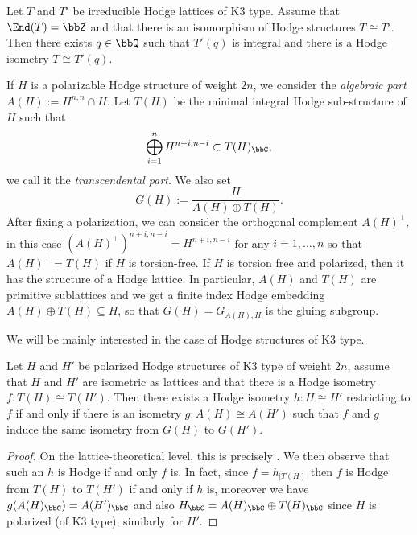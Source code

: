 \documentclass{amsart}
\begin{document}
\begin{proposition}\label{prop:meinsma}
    Let \(T\) and \(T'\) be irreducible Hodge lattices of K3 type. Assume that \(\End(T)=\bbZ\) and that there is an isomorphism of Hodge structures \(T\cong T'\). Then there exists \(q\in \bbQ\) such that \(T'(q)\) is integral and there is a Hodge isometry \(T\cong T'(q)\).
\end{proposition}

If \(H\) is a polarizable Hodge structure of weight \(2n\), we consider the \textit{algebraic part} \(A(H):= H^{n,n}\cap H\). Let \(T(H)\) be the minimal integral Hodge sub-structure of \(H\) such that \[\bigoplus_{i=1}^n H^{n+i,n-i}\subset T(H)_\bbC,\] we call it the \textit{transcendental part}. We also set \[G(H):=\frac{H}{A(H)\oplus T(H)}.\] After fixing a polarization, we can consider the orthogonal complement \(A(H)^\perp\), in this case \((A(H)^\perp)^{n+i,n-i}=H^{n+i,n-i}\) for any \(i=1,\dots, n\) so that \(A(H)^\perp=T(H)\) if \(H\) is torsion-free. If \(H\) is torsion free and polarized, then it has the structure of a Hodge lattice. In particular, \(A(H)\) and \(T(H)\) are primitive sublattices and we get a finite index Hodge embedding \(A(H)\oplus T(H)\subseteq H\), so that \(G(H)=G_{A(H),H}\) is the gluing subgroup. 

We will be mainly interested in the case of Hodge structures of K3 type.



\begin{lemma}\label{lem:extension_to_Hodge_isom1}
    Let \(H\) and \(H'\) be polarized Hodge structures of K3 type of weight \(2n\), assume that \(H\) and \(H'\) are isometric as lattices and that there is a Hodge isometry \(f\colon T(H)\cong T(H')\). Then there exists a Hodge isometry \(h\colon H\cong H'\) restricting to \(f\) if and only if there is an isometry \(g\colon A(H)\cong A(H')\) such that \(f\) and \(g\) induce the same isometry from \(G(H)\) to \(G(H')\).
\end{lemma}
\begin{proof}
    On the lattice-theoretical level, this is precisely \cite[Corollary 1.5.2]{Nikulin_integral}. We then observe that such an \(h\) is Hodge if and only \(f\) is. In fact, since \(f=h_{\mid T(H)}\) then \(f\) is Hodge from \(T(H)\) to \(T(H')\) if and only if \(h\) is, moreover we have \(g(A(H)_\bbC)=A(H')_\bbC\) and also \(H_\bbC=A(H)_\bbC\oplus T(H)_\bbC\) since \(H\) is polarized (of K3 type), similarly for \(H'\). 
\end{proof}
\end{document}
